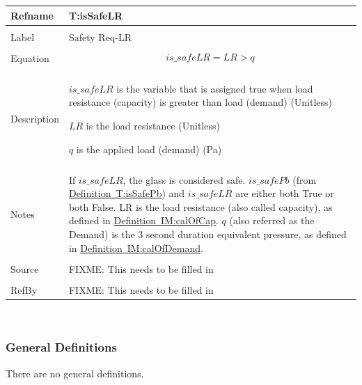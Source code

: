 \documentclass[12pt]{article}
\begin{document}
\noindent \begin{minipage}{\textwidth}
\begin{tabular}{p{} p{}}
\toprule \textbf{Refname} & \textbf{T:isSafeLR}
\label{T:isSafeLR}
\\ \midrule \\
Label & Safety Req-LR
\\ \midrule \\
Equation & \begin{dmath}
           is\_safeLR=LR>q
           \end{dmath}
\\ \midrule \\
Description & \begin{symbDescription}
              \item{$is\_safeLR$ is the variable that is assigned true when load resistance (capacity) is greater than load (demand) (Unitless)}
              \item{$LR$ is the load resistance (Unitless)}
              \item{$q$ is the applied load (demand) (Pa)}
              \end{symbDescription}
\\ \midrule \\
Notes & If $is\_safeLR$, the glass is considered safe. $is\_safePb$ (from \hyperref[T:isSafePb]{Definition~T:isSafePb}) and $is\_safeLR$ are either both True or both False. LR is the load resistance (also called capacity), as defined in \hyperref[IM:calOfCap]{Definition~IM:calOfCap}. $q$ (also referred as the Demand) is the 3 second duration equivalent pressure, as defined in \hyperref[IM:calOfDemand]{Definition~IM:calOfDemand}.
\\ \midrule \\
Source & FIXME: This needs to be filled in
\\ \midrule \\
RefBy & FIXME: This needs to be filled in
\\ \bottomrule \end{tabular}
\end{minipage}\\
\subsubsection{General Definitions}
\label{Sec:GDs}
There are no general definitions.
\end{document}
